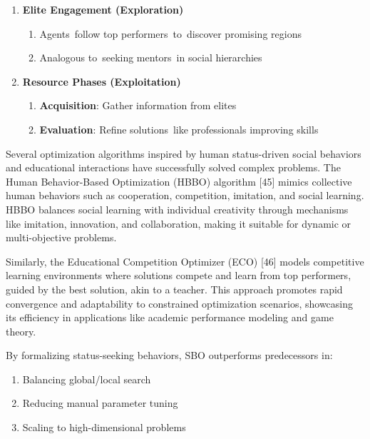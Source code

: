 \documentclass{article} %
\begin{document}
\begin{enumerate}
\item  \textbf{Elite Engagement (Exploration)}

\begin{enumerate}
\item  Agents~follow top performers~to~discover promising regions

\item  Analogous to~seeking mentors~in social hierarchies
\end{enumerate}

\item  \textbf{Resource Phases (Exploitation)}

\begin{enumerate}
\item  \textbf{Acquisition}: Gather information from elites

\item  \textbf{Evaluation}: Refine solutions~like professionals improving skills
\end{enumerate}
\end{enumerate}



Several optimization algorithms inspired by human status-driven social behaviors and educational interactions have successfully solved complex problems. The Human Behavior-Based Optimization (HBBO) algorithm [45] mimics collective human behaviors such as cooperation, competition, imitation, and social learning. HBBO balances social learning with individual creativity through mechanisms like imitation, innovation, and collaboration, making it suitable for dynamic or multi-objective problems.

Similarly, the Educational Competition Optimizer (ECO) [46] models competitive learning environments where solutions compete and learn from top performers, guided by the best solution, akin to a teacher. This approach promotes rapid convergence and adaptability to constrained optimization scenarios, showcasing its efficiency in applications like academic performance modeling and game theory.



By formalizing status-seeking behaviors, SBO outperforms predecessors in:

\begin{enumerate}
\item  Balancing global/local search

\item  Reducing manual parameter tuning

\item  Scaling to high-dimensional problems
\end{enumerate}
\end{document}
